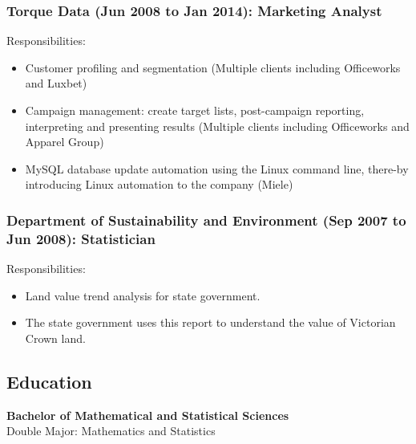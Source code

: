 \documentclass{article}
\begin{document}
\subsubsection{Torque Data (Jun 2008 to Jan 2014): Marketing Analyst}

Responsibilities:
\begin{itemize}
    \item Customer profiling and segmentation (Multiple clients including Officeworks and Luxbet) 
    \item Campaign management: create target lists, post-campaign reporting, interpreting and presenting results (Multiple clients including Officeworks and Apparel Group)
    \item MySQL database update automation using the Linux command line, there\hyp{}by introducing Linux automation to the company (Miele)
\end{itemize}

\subsubsection{Department of Sustainability and Environment (Sep 2007 to Jun 2008): Statistician}

Responsibilities:
\begin{itemize}
    \item Land value trend analysis for state government.
    \item The state government uses this report to understand the value of Victorian Crown land.
\end{itemize}

\subsection{Education}
\textbf{Bachelor of Mathematical and Statistical Sciences}
\\
Double Major: Mathematics and Statistics
\end{document}
